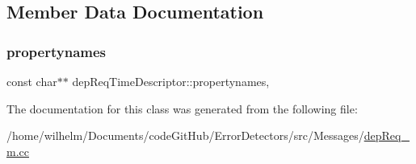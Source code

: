\subsection{Member Data Documentation}
\mbox{\label{classdep_req_time_descriptor_a8027018b5fe1aeb72652563cd2a9f505}} 
\subsubsection{\texorpdfstring{propertynames}{propertynames}}
{\footnotesize\ttfamily const char$\ast$$\ast$ dep\+Req\+Time\+Descriptor\+::propertynames\hspace{0.3cm}{\ttfamily [mutable]}, {\ttfamily [private]}}



The documentation for this class was generated from the following file\+:\begin{DoxyCompactItemize}
\item 
/home/wilhelm/\+Documents/code\+Git\+Hub/\+Error\+Detectors/src/\+Messages/\hyperlink{dep_req__m_8cc}{dep\+Req\+\_\+m.\+cc}\end{DoxyCompactItemize}
